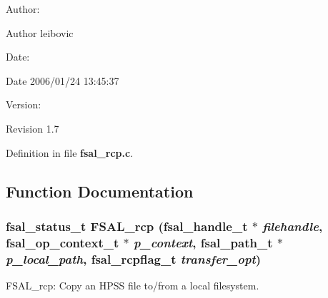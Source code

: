 \begin{Desc}
\item[Author:]\begin{Desc}
\item[Author]leibovic \end{Desc}
\end{Desc}
\begin{Desc}
\item[Date:]\begin{Desc}
\item[Date]2006/01/24 13:45:37 \end{Desc}
\end{Desc}
\begin{Desc}
\item[Version:]\begin{Desc}
\item[Revision]1.7 \end{Desc}
\end{Desc}


Definition in file {\bf fsal\_\-rcp.c}.

\subsection{Function Documentation}
\subsubsection{\setlength{\rightskip}{0pt plus 5cm}fsal\_\-status\_\-t FSAL\_\-rcp (fsal\_\-handle\_\-t $\ast$ {\em filehandle}, fsal\_\-op\_\-context\_\-t $\ast$ {\em p\_\-context}, fsal\_\-path\_\-t $\ast$ {\em p\_\-local\_\-path}, fsal\_\-rcpflag\_\-t {\em transfer\_\-opt})}\label{fsal__rcp_8c_a1}


FSAL\_\-rcp: Copy an HPSS file to/from a local filesystem.

